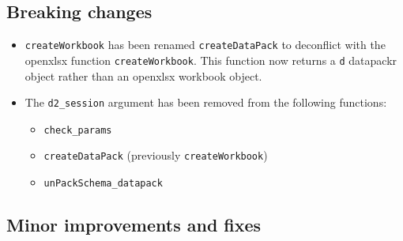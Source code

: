 \documentclass[
  openany]{book}
\providecommand{\tightlist}{%
  \setlength{\itemsep}{0pt}\setlength{\parskip}{0pt}}
\begin{document}
\hypertarget{breaking-changes-2}{%
\subsection{Breaking changes}\label{breaking-changes-2}}

\begin{itemize}
\tightlist
\item
  \texttt{createWorkbook} has been renamed \texttt{createDataPack} to deconflict with the
  openxlsx function \texttt{createWorkbook}. This function now returns a \texttt{d}
  datapackr object rather than an openxlsx workbook object.
\item
  The \texttt{d2\_session} argument has been removed from the following functions:

  \begin{itemize}
  \tightlist
  \item
    \texttt{check\_params}
  \item
    \texttt{createDataPack} (previously \texttt{createWorkbook})
  \item
    \texttt{unPackSchema\_datapack}
  \end{itemize}
\end{itemize}

\hypertarget{minor-improvements-and-fixes-2}{%
\subsection{Minor improvements and fixes}\label{minor-improvements-and-fixes-2}}
\end{document}

